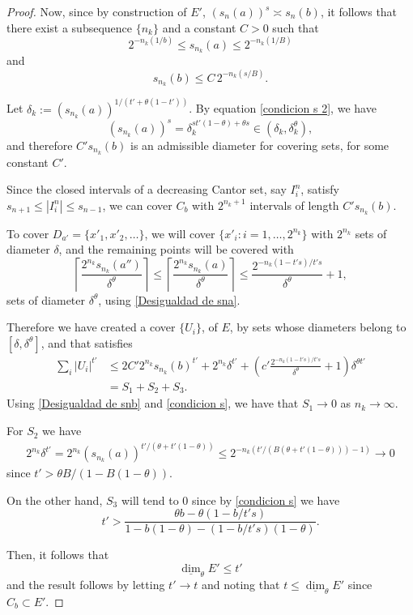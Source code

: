 \documentclass[11pt,reqno,bookmarksnumbered,raiselinks,breaklinks,colorlinks,plainpages]{amsart}
\begin{document}
\begin{proof}
Now, since by construction of $E'$, $(s_n(a))^s \asymp s_n(b)$, it follows that there exist a subsequence $\{n_k\}$ and a constant $C > 0$ such that
\begin{equation}\label{Desigualdad de sna}
2^{-n_k(1/b)} \leq s_{n_k}(a) \leq 2^{-n_k(1/B)}
\end{equation}
and
\begin{equation}\label{Desigualdad de snb}
s_{n_k}(b) \leq C \, 2^{-n_k(s/B)}.
\end{equation}



Let $\delta_k := (s_{n_k}(a))^{1/(t' + \theta(1 - t'))}$. 
By equation \eqref{condicion s 2}, we have 
\[
(s_{n_k}(a))^s = \delta_k^{s t'(1 - \theta) + \theta s} \in (\delta_k, \delta_k^\theta),
\]
and therefore $C' s_{n_k}(b)$ is an admissible diameter for covering sets, for some constant $C'$.

Since the closed intervals of a decreasing Cantor set, say \( I_i^n \), satisfy \( s_{n+1} \leq |I_i^n| \leq s_{n-1} \), we can cover \( C_b \) with \( 2^{n_k + 1} \) intervals of length \(C' s_{n_k}(b) \).

To cover \( D_{a'} = \{x'_1, x'_2, \ldots\} \), we will cover \( \{x'_i : i = 1, \ldots, 2^{n_k}\} \) with \( 2^{n_k} \) sets of diameter \( \delta \), and the remaining points will be covered with
\[
\left\lceil \frac{2^{n_k} s_{n_k}(a'')}{\delta^\theta} \right\rceil \leq \left\lceil \frac{2^{n_k} s_{n_k}(a)}{\delta^\theta} \right\rceil \leq \frac{2^{-n_k(1 - t's)/t's}}{\delta^\theta} + 1,
\]
sets of diameter \( \delta^\theta \), using \eqref{Desigualdad de sna}.


Therefore we have created a cover \( \{U_i\} \), of \( E \), by sets whose diameters belong to \( [\delta, \delta^{\theta}] \), and that satisfies
\begin{align*}
    \sum_i |U_i|^{t'} &\leq 2C' 2^{n_k} s_{n_k}(b)^{t'} + 2^{n_k} \delta^{t'} + \left( c' \frac{2^{-n_k(1 - t's)/t's}}{\delta^\theta} + 1 \right) \delta^{\theta t'} \\
    &= S_1 + S_2 + S_3.
\end{align*}
Using \eqref{Desigualdad de snb} and \eqref{condicion s}, we have that \( S_1 \to 0 \) as \( n_k \to \infty \).

For \( S_2 \) we have
\begin{align*}
    2^{n_k} \delta^{t'} = 2^{n_k} (s_{n_k}(a))^{t'/(\theta + t'(1 - \theta))} \leq 2^{-n_k(t'/(B(\theta + t'(1 - \theta))) - 1)} \to 0
\end{align*}
since \( t' > \theta B / (1 - B(1 - \theta)) \).

On the other hand, \( S_3 \) will tend to \( 0 \) since by \eqref{condicion s} we have 
\[
t' > \frac{\theta b - \theta(1 - b / t's)}{1 - b(1 - \theta) - (1 - b / t's)(1 - \theta)}.
\]

Then, it follows that
\[
\underline{\dim}_\theta E' \leq t'
\]
and the result follows by letting \( t' \to t \) and noting that \( t \leq \underline{\dim}_\theta E' \) since \( C_b \subset E' \).
\end{proof}
\end{document}
